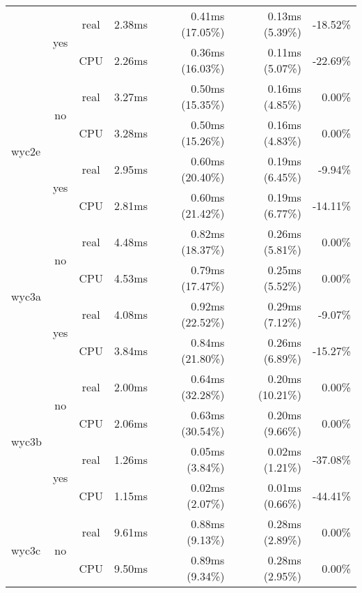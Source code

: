 \documentclass[en]{pracamgr}
\begin{document}
\begin{small}
\begin{longtable}{|l|c|c|r|r|r|r|}
                          \cline{2-7}
                          & \multirow{2}{*}{yes} & real & 2.38ms & 0.41ms (17.05\%) & 0.13ms (5.39\%) & -18.52\% \\*
                          &                      & CPU  & 2.26ms & 0.36ms (16.03\%) & 0.11ms (5.07\%) & -22.69\% \\
\hline
\multirow{4}{*}{wyc2e}    & \multirow{2}{*}{no}  & real & 3.27ms & 0.50ms (15.35\%) & 0.16ms (4.85\%) & 0.00\% \\*
                          &                      & CPU  & 3.28ms & 0.50ms (15.26\%) & 0.16ms (4.83\%) & 0.00\% \\*
                          \cline{2-7}
                          & \multirow{2}{*}{yes} & real & 2.95ms & 0.60ms (20.40\%) & 0.19ms (6.45\%) & -9.94\% \\*
                          &                      & CPU  & 2.81ms & 0.60ms (21.42\%) & 0.19ms (6.77\%) & -14.11\% \\
\hline
\multirow{4}{*}{wyc3a}    & \multirow{2}{*}{no}  & real & 4.48ms & 0.82ms (18.37\%) & 0.26ms (5.81\%) & 0.00\% \\*
                          &                      & CPU  & 4.53ms & 0.79ms (17.47\%) & 0.25ms (5.52\%) & 0.00\% \\*
                          \cline{2-7}
                          & \multirow{2}{*}{yes} & real & 4.08ms & 0.92ms (22.52\%) & 0.29ms (7.12\%) & -9.07\% \\*
                          &                      & CPU  & 3.84ms & 0.84ms (21.80\%) & 0.26ms (6.89\%) & -15.27\% \\
\hline
\multirow{4}{*}{wyc3b}    & \multirow{2}{*}{no}  & real & 2.00ms & 0.64ms (32.28\%) & 0.20ms (10.21\%) & 0.00\% \\*
                          &                      & CPU  & 2.06ms & 0.63ms (30.54\%) & 0.20ms (9.66\%) & 0.00\% \\*
                          \cline{2-7}
                          & \multirow{2}{*}{yes} & real & 1.26ms & 0.05ms (3.84\%) & 0.02ms (1.21\%) & -37.08\% \\*
                          &                      & CPU  & 1.15ms & 0.02ms (2.07\%) & 0.01ms (0.66\%) & -44.41\% \\
\hline
\multirow{4}{*}{wyc3c}    & \multirow{2}{*}{no}  & real & 9.61ms & 0.88ms (9.13\%) & 0.28ms (2.89\%) & 0.00\% \\*
                          &                      & CPU  & 9.50ms & 0.89ms (9.34\%) & 0.28ms (2.95\%) & 0.00\% \\*

\end{longtable}
\end{small}
\end{document}
